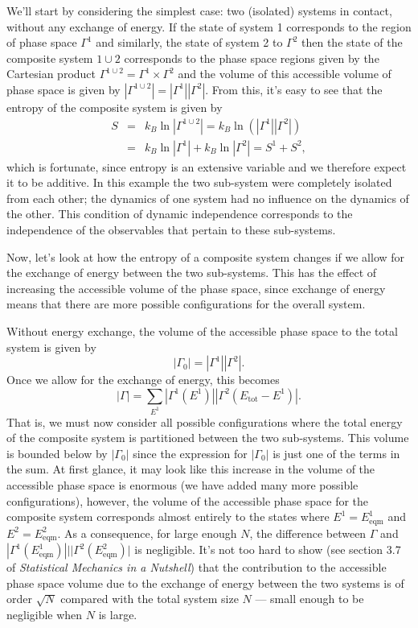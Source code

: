We'll start by considering the simplest case: two (isolated) systems in contact, without any exchange of energy. If the state of system 1 corresponds to the region of phase space $\Gamma^1$ and similarly, the state of system 2 to $\Gamma^2$ then the state of the composite system $1\cup 2$ corresponds to the phase space regions given by the Cartesian product $\Gamma^{1\cup 2}=\Gamma^1\times\Gamma^2$ and the volume of this accessible volume of phase space is given by $|\Gamma^{1\cup 2}|=|\Gamma^1||\Gamma^2|$. From this, it's easy to see that the entropy of the composite system is given by
\begin{eqnarray*}
	S &=& k_B\ln|\Gamma^{1\cup 2}| = k_B\ln(|\Gamma^1||\Gamma^2|)\\
		&=& k_B\ln|\Gamma^1| + k_B\ln|\Gamma^2| = S^1 + S^2,
\end{eqnarray*}
which is fortunate, since entropy is an extensive variable and we therefore expect it to be additive.
In this example the two sub-system were completely isolated from each other; the dynamics of one system had no influence on the dynamics of the other. This condition of dynamic independence corresponds to the independence of the observables that pertain to these sub-systems.

Now, let's look at how the entropy of a composite system changes if we allow for the exchange of energy between the two sub-systems. This has the effect of increasing the accessible volume of the phase space, since exchange of energy means that there are more possible configurations for the overall system.

Without energy exchange, the volume of the accessible phase space to the total system is given by
$$
	|\Gamma_0| = |\Gamma^1||\Gamma^2|.
$$
Once we allow for the exchange of energy, this becomes
$$
	|\Gamma| = \sum_{E^1}|\Gamma^1(E^1)||\Gamma^2(E_\text{tot}-E^1)|.
$$
That is, we must now consider all possible configurations where the total energy of the composite system is partitioned between the two sub-systems. This volume is bounded below by $|\Gamma_0|$ since the expression for $|\Gamma_0|$ is just one of the terms in the sum. At first glance, it may look like this increase in the volume of the accessible phase space is enormous (we have added many more possible configurations), however, the volume of the accessible phase space for the composite system corresponds almost entirely to the states where $E^1=E^1_\text{eqm}$ and $E^2=E^2_\text{eqm}$. As a consequence, for large enough $N$, the difference between $\Gamma$ and $|\Gamma^1(E^1_\text{eqm})|||\Gamma^2(E^2_\text{eqm})|$ is negligible. It's not too hard to show (see section 3.7 of \emph{Statistical Mechanics in a Nutshell}) that the contribution to the accessible phase space volume due to the exchange of energy between the two systems is of order $\sqrt{N}$ compared with the total system size $N$ --- small enough to be negligible when $N$ is large.

